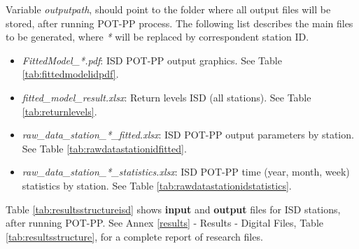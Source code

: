 \documentclass[12pt,oneside]{reedthesis}
\providecommand{\tightlist}{%
  \setlength{\itemsep}{0pt}\setlength{\parskip}{0pt}}
\begin{document}
Variable \emph{outputpath}, should point to the folder where all output files will be stored, after running POT-PP process. The following list describes the main files to be generated, where \emph{*} will be replaced by correspondent station ID.
\begin{itemize}
\tightlist
\item
  \emph{FittedModel\_*.pdf}: ISD POT-PP output graphics. See Table \ref{tab:fittedmodelidpdf}.
\item
  \emph{fitted\_model\_result.xlsx}: Return levels ISD (all stations). See Table \ref{tab:returnlevels}.
\item
  \emph{raw\_data\_station\_*\_fitted.xlsx}: ISD POT-PP output parameters by station. See Table \ref{tab:rawdatastationidfitted}.
\item
  \emph{raw\_data\_station\_*\_statistics.xlsx}: ISD POT-PP time (year, month, week) statistics by station. See Table \ref{tab:rawdatastationidstatistics}.
\end{itemize}
Table \ref{tab:resultsstructureisd} shows \textbf{input} and \textbf{output} files for ISD stations, after running POT-PP. See Annex \ref{results} - Results - Digital Files, Table \ref{tab:resultsstructure}, for a complete report of research files.
\end{document}
